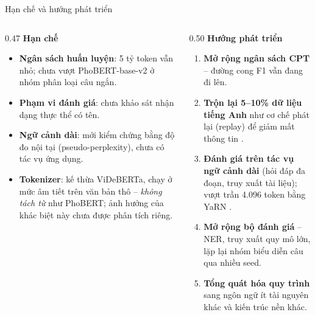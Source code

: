 \begin{frame}{Hạn chế và hướng phát triển}
\vspace{0.3em}
\begin{columns}[T]
\begin{column}{0.47\textwidth}
  \textbf{Hạn chế}
  \begin{itemize}\itemsep2pt
    \item \textbf{Ngân sách huấn luyện}: 5 tỷ token vẫn nhỏ; chưa vượt
          PhoBERT-base-v2 ở nhóm phân loại câu ngắn.
    \item \textbf{Phạm vi đánh giá}: chưa khảo sát nhận dạng thực thể có tên.
    \item \textbf{Ngữ cảnh dài}: mới kiểm chứng bằng độ đo nội tại
          (pseudo-perplexity), chưa có tác vụ ứng dụng.
    \item \textbf{Tokenizer}: kế thừa ViDeBERTa, chạy ở mức âm tiết trên văn
          bản thô -- \emph{không tách từ} như PhoBERT; ảnh hưởng của khác
          biệt này chưa được phân tích riêng.
  \end{itemize}
\end{column}

\begin{column}{0.50\textwidth}
  \textbf{Hướng phát triển}
  \begin{enumerate}\itemsep2pt
    \item \textbf{Mở rộng ngân sách CPT} -- đường cong F1 vẫn đang đi lên.
    \item \textbf{Trộn lại 5--10\% dữ liệu tiếng Anh} như cơ chế phát lại
          (replay) để giảm mất thông tin .
    \item \textbf{Đánh giá trên tác vụ ngữ cảnh dài} (hỏi đáp đa đoạn, truy
          xuất tài liệu); vượt trần 4.096 token bằng YaRN .
    \item \textbf{Mở rộng bộ đánh giá} -- NER, truy xuất quy mô lớn, lặp lại
          nhóm biểu diễn câu qua nhiều seed.
    \item \textbf{Tổng quát hóa quy trình} sang ngôn ngữ ít tài nguyên khác
          và kiến trúc nền khác.
  \end{enumerate}
\end{column}
\end{columns}
\end{frame}

